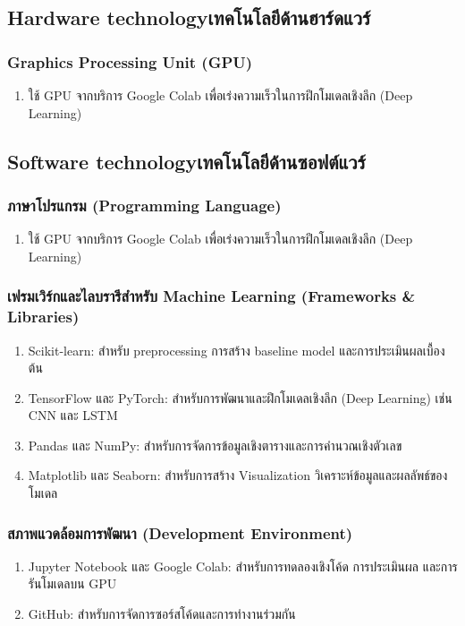 \subsection{\ifenglish Hardware technology\else เทคโนโลยีด้านฮาร์ดแวร์\fi}

\subsubsection{Graphics Processing Unit (GPU)}
\begin{enumerate}
    \item ใช้ GPU จากบริการ Google Colab เพื่อเร่งความเร็วในการฝึกโมเดลเชิงลึก (Deep Learning)
\end{enumerate}

\subsection{\ifenglish Software technology\else เทคโนโลยีด้านซอฟต์แวร์\fi}

\subsubsection{ภาษาโปรแกรม (Programming Language)}
\begin{enumerate}
    \item ใช้ GPU จากบริการ Google Colab เพื่อเร่งความเร็วในการฝึกโมเดลเชิงลึก (Deep Learning)
\end{enumerate}

\subsubsection{เฟรมเวิร์กและไลบรารีสำหรับ Machine Learning (Frameworks \& Libraries)}
\begin{enumerate}
    \item Scikit-learn: สำหรับ preprocessing การสร้าง baseline model และการประเมินผลเบื้องต้น
    \item TensorFlow และ PyTorch: สำหรับการพัฒนาและฝึกโมเดลเชิงลึก (Deep Learning) เช่น CNN และ LSTM
    \item Pandas และ NumPy: สำหรับการจัดการข้อมูลเชิงตารางและการคำนวณเชิงตัวเลข
    \item Matplotlib และ Seaborn: สำหรับการสร้าง Visualization วิเคราะห์ข้อมูลและผลลัพธ์ของโมเดล
\end{enumerate}

\subsubsection{สภาพแวดล้อมการพัฒนา (Development Environment)}
\begin{enumerate}
    \item Jupyter Notebook และ Google Colab: สำหรับการทดลองเชิงโค้ด การประเมินผล และการรันโมเดลบน GPU
    \item GitHub: สำหรับการจัดการซอร์สโค้ดและการทำงานร่วมกัน
\end{enumerate}

